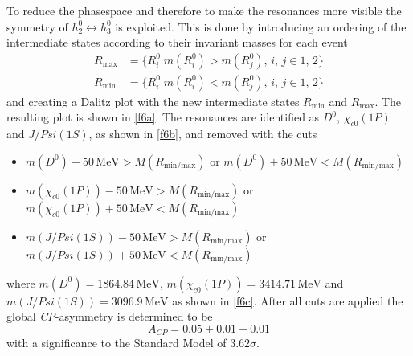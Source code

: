 To reduce the phasespace and therefore to make the resonances more visible the symmetry of $h_2^0 \leftrightarrow h_3^0$ is
exploited. This is done by introducing an ordering of the intermediate states according to their invariant masses for each event
\begin{align*}
  R_\text{max} &= \{R_i^0 | m(R_i^0) > m(R_j^0) , \, i,\,j \in {1, \, 2}\} \\
  R_\text{min} &= \{R_i^0 | m(R_i^0) < m(R_j^0) , \, i,\,j \in {1, \, 2}\}
\end{align*}
and creating a Dalitz plot with the new intermediate states $R_\text{min}$ and $R_\text{max}$.
The resulting plot is shown in \autoref{f6a}. The resonances are identified as $D^0$, $\chi_{c0}(1P)$ and $J/Psi(1S)$, as
shown in \autoref{f6b}, and removed with the cuts
\begin{itemize}
  \item $m(D^0) - 50 \, \si{\mega\eV} > M(R_{\text{min/max}})$ or $m(D^0) + 50 \, \si{\mega\eV} < M(R_{\text{min/max}})$
  \item $m(\chi_{c0}(1P)) - 50 \, \si{\mega\eV} > M(R_{\text{min/max}})$ or $m(\chi_{c0}(1P)) + 50 \, \si{\mega\eV} < M(R_{\text{min/max}})$
  \item $m(J/Psi(1S)) - 50 \, \si{\mega\eV} > M(R_{\text{min/max}})$ or $m(J/Psi(1S)) + 50 \, \si{\mega\eV} < M(R_{\text{min/max}})$
\end{itemize}
where $m(D^0) = 1864.84 \, \si{\mega\eV}$, $m(\chi_{c0}(1P)) = 3414.71 \, \si{\mega\eV}$ and $m(J/Psi(1S)) = 3096.9  \, \si{\mega\eV}$ \cite{pdg}
as shown in \autoref{f6c}.
After all cuts are applied the global \textit{CP}-asymmetry is determined to be
\begin{equation}
  A_\textit{CP} = 0.05  \pm  0.01 \pm 0.01
\end{equation}
with a significance to the Standard Model of $3.62 \sigma$.

